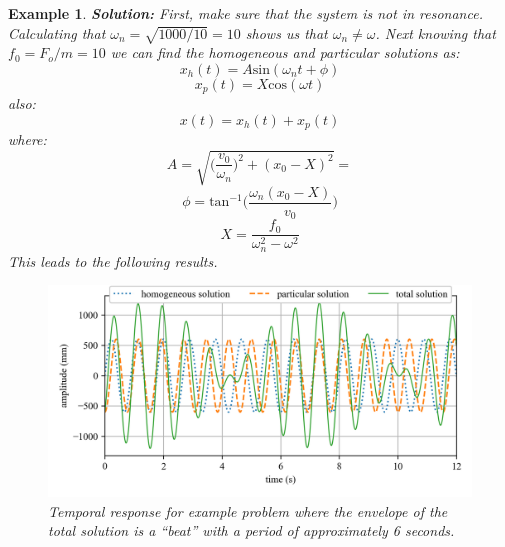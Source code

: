 \documentclass[12pt,letter]{article}
\newtheorem{ex}{Example}
\numberwithin{ex}{section} %
\newenvironment{example}{\begin{mdframed}[middlelinewidth=0.5mm]\begin{ex}\normalfont}{\end{ex}\end{mdframed}}
\numberwithin{re}{section} %
\numberwithin{vcs}{section} %
\begin{document}
\begin{example}
			\noindent\textbf{Solution:} First, make sure that the system is not in resonance. Calculating that $\omega_n = \sqrt{1000/10} = 10$ shows us that $\omega_n \neq \omega$. Next knowing that $f_0 = F_o/m = 10$ we can find the homogeneous and particular solutions as:
			\begin{equation}
				x_h(t) = A\text{sin}(\omega_n t + \phi)
			\end{equation}				
			\begin{equation}
				x_p(t) = X\text{cos}(\omega t) 
			\end{equation}	
			also:			
			\begin{equation}
				x(t) = x_h(t) + x_p(t)
			\end{equation}	
			where:			
			\begin{equation}
				A = \sqrt{\bigg(\frac{v_0}{\omega_n}\bigg)^2+(x_0-X)^2} = 
			\end{equation}				
			\begin{equation}
				\phi = \text{tan}^{-1}\bigg(\frac{\omega_n(x_0-X)}{v_0}\bigg)
			\end{equation}				
			\begin{equation}
				X = \frac{f_0}{\omega_n^2-\omega^2}
			\end{equation}			
			This leads to the following results. 
			\begin{figure}[H]
				\centering
				\includegraphics[]{../figures/homogeneous_and_particular_solutions.png}
				\caption{Temporal response for example problem where the envelope of the total solution is a ``beat'' with a period of approximately 6 seconds.}
			\end{figure}			

\end{example}
\end{document}
